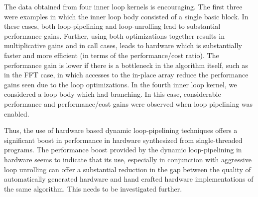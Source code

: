 \documentclass[conference]{IEEEtran}
\begin{document}
The data obtained from four inner loop
kernels is encouraging. The first three  were examples in
which the inner loop body consisted of a single basic 
block. In these cases, both loop-pipelining
and loop-unrolling lead to substantial performance gains.  Further,
using both optimizations together results in multiplicative gains
and in call cases, leads to hardware which is substantially
faster and more efficient (in terms of the performance/cost ratio).
The performance gain is lower if there is a bottleneck in the
algorithm itself, such as in the FFT case, in which accesses to
the in-place array reduce the performance gains seen due to
the loop optimizations.
In the fourth inner loop kernel, we considered a loop body
which had branching.  In this case, considerable performance
and performance/cost gains were observed when loop pipelining
was enabled.

Thus, the use of hardware based dynamic loop-pipelining techniques 
offers a significant boost in performance in 
hardware synthesized from single-threaded programs.  
The performance boost provided by the dynamic loop-pipelining
in hardware seems to indicate that its use,
especially in conjunction with aggressive loop unrolling can offer 
a substantial reduction in the gap between 
the quality of automatically generated hardware and hand crafted 
hardware implementations of the same algorithm.  This needs
to be investigated further.




\end{document}
